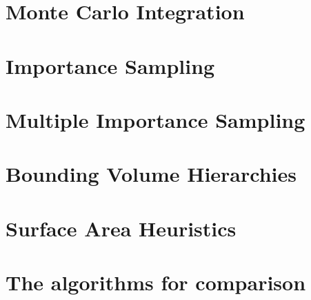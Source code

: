 \section{Monte Carlo Integration}
\label{ch:preliminaries:mci}

\section{Importance Sampling}
\label{ch:preliminaries:is}

\section{Multiple Importance Sampling}
\label{ch:preliminaries:mis}

\section{Bounding Volume Hierarchies}
\label{sec:preliminaries:bvh}

\section{Surface Area Heuristics}
\label{sec:preliminaries:sah}

\section{The algorithms for comparison}
\label{sec:preliminaries:com}
